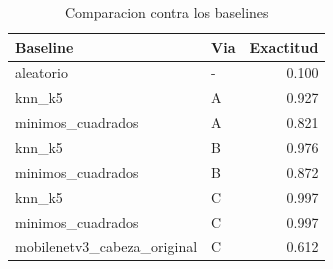 \begin{table}[htbp]
\caption{Comparacion contra los baselines}
\label{tab:baselines}
\begin{tabular}{llr}
\toprule
Baseline & Via & Exactitud \\
\midrule
aleatorio & - & 0.100 \\
knn\_k5 & A & 0.927 \\
minimos\_cuadrados & A & 0.821 \\
knn\_k5 & B & 0.976 \\
minimos\_cuadrados & B & 0.872 \\
knn\_k5 & C & 0.997 \\
minimos\_cuadrados & C & 0.997 \\
mobilenetv3\_cabeza\_original & C & 0.612 \\
\bottomrule
\end{tabular}
\end{table}
